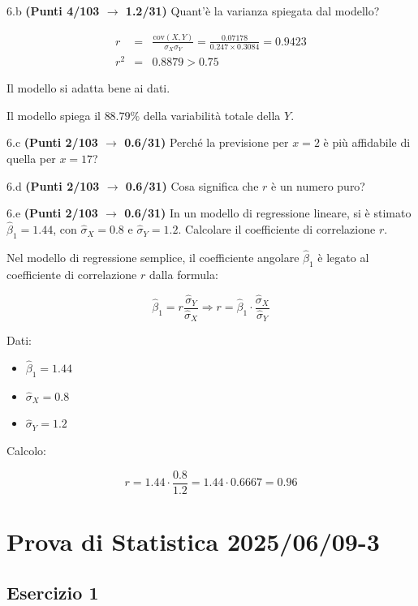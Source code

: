 \documentclass[
  11pt,
]{book}
\providecommand{\tightlist}{%
  \setlength{\itemsep}{0pt}\setlength{\parskip}{0pt}}
\theoremstyle{mytheoremstyle}
\theoremstyle{mydefstyle}
\begin{document}
6.b \textbf{(Punti 4/103 \(\rightarrow\) 1.2/31)} Quant'è la varianza spiegata dal modello?

\begin{eqnarray*}
r&=&\frac{\text{cov}(X,Y)}{\sigma_X\sigma_Y}=\frac{ 0.07178 }{ 0.247 \times 0.3084 }= 0.9423 \\ 
r^2&=& 0.8879 > 0.75
\end{eqnarray*}

Il modello si adatta bene ai dati.

Il modello spiega il \(88.79\%\) della variabilità totale della \(Y\).

6.c \textbf{(Punti 2/103 \(\rightarrow\) 0.6/31)} Perché la previsione per \(x=2\) è più affidabile di quella per \(x=17\)?

6.d \textbf{(Punti 2/103 \(\rightarrow\) 0.6/31)} Cosa significa che \(r\) è un numero puro?

6.e \textbf{(Punti 2/103 \(\rightarrow\) 0.6/31)} In un modello di regressione lineare, si è stimato \(\hat\beta_1 = 1.44\), con \(\hat\sigma_X = 0.8\) e \(\hat\sigma_Y = 1.2\). Calcolare il coefficiente di correlazione \(r\).

Nel modello di regressione semplice, il coefficiente angolare \(\hat\beta_1\) è legato al coefficiente di correlazione \(r\) dalla formula:

\[
\hat\beta_1 = r \frac{\hat\sigma_Y}{\hat\sigma_X}
\Rightarrow
r = \hat\beta_1 \cdot \frac{\hat\sigma_X}{\hat\sigma_Y}
\]

Dati:

\begin{itemize}
\tightlist
\item
  \(\hat\beta_1 = 1.44\)
\item
  \(\hat\sigma_X = 0.8\)
\item
  \(\hat\sigma_Y = 1.2\)
\end{itemize}

Calcolo:

\[
r = 1.44 \cdot \frac{0.8}{1.2} = 1.44 \cdot 0.6667 = 0.96
\]

\section{Prova di Statistica 2025/06/09-3}\label{prova-di-statistica-20250609-3}

\subsection{Esercizio 1}\label{esercizio-1-45}
\end{document}
